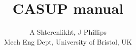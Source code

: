 \documentclass[a4paper,12pt]{article}
\title{CASUP manual}
\author{A Shterenlikht, J Phillips \\
Mech Eng Dept, University of Bristol, UK}
\begin{document}
\newcommand{\tenrtwo}[1]{\mathbold{#1}}
\newcommand{\tenrfour}[1]{\mathcal{#1}}

\maketitle

\tableofcontents

\begin{comment}





\end{comment}



\begin{comment}



\end{comment}



\end{document}
